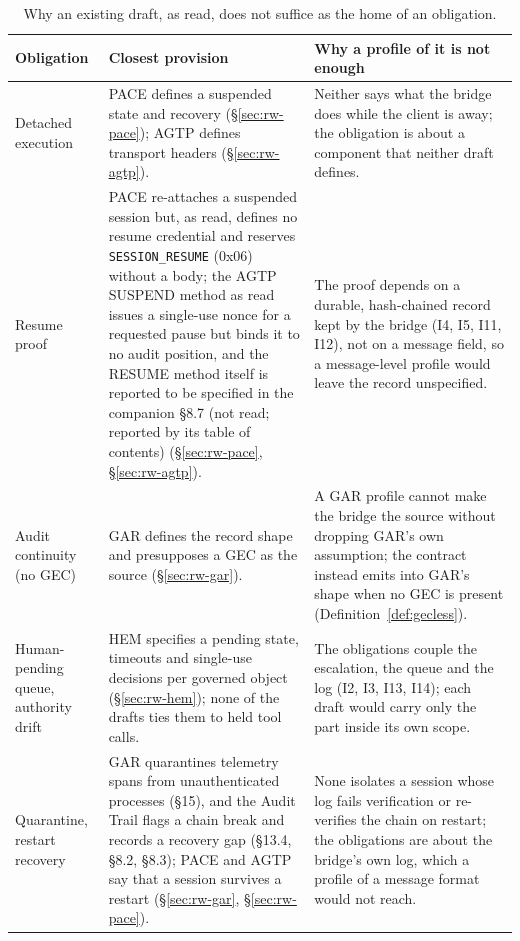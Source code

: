 \begin{table}[htbp]
\centering
\caption{Why an existing draft, as read, does not suffice as the home of
an obligation.}
\label{tab:why-separate}
\footnotesize
\begin{tabularx}{\columnwidth}{p{} X X}
\toprule
\textbf{Obligation} & \textbf{Closest provision} & \textbf{Why a profile of it is not enough} \\
\midrule
Detached execution & PACE defines a suspended state and recovery
(\S\ref{sec:rw-pace}); AGTP defines transport headers
(\S\ref{sec:rw-agtp}). & Neither says what the bridge does while the
client is away; the obligation is about a component that neither draft
defines. \\
Resume proof & PACE re-attaches a suspended session
but, as read, defines no resume credential and reserves
\texttt{SESSION\_RESUME} (0x06) without a body; the AGTP SUSPEND method as read issues
a single-use nonce for a requested pause but binds it to no audit
position, and the RESUME method itself is reported to be specified in the companion
\cite{I-D.hood-agtp-standard-methods} \S 8.7 (not read; reported by its table of contents) (\S\ref{sec:rw-pace}, \S\ref{sec:rw-agtp}). & The
proof depends on a durable, hash-chained record kept by the bridge
(I4, I5, I11, I12), not on a message field, so a message-level profile
would leave the record unspecified. \\
Audit continuity (no GEC) & GAR defines the record shape and presupposes a
GEC as the source (\S\ref{sec:rw-gar}). & A GAR profile cannot make the
bridge the source without dropping GAR's own assumption; the contract
instead emits into GAR's shape when no GEC is present
(Definition~\ref{def:gecless}). \\
Human-pending queue, authority drift &
HEM specifies a pending state, timeouts and single-use decisions per
governed object (\S\ref{sec:rw-hem}); none of the drafts ties them to held
tool calls. & The obligations couple the
escalation, the queue and the log (I2, I3, I13, I14); each draft would
carry only the part inside its own scope. \\
Quarantine, restart recovery & GAR quarantines telemetry spans from
unauthenticated processes (\S15), and the Audit Trail flags a chain break
and records a recovery gap (\S13.4, \S8.2, \S8.3); PACE and AGTP say that a
session survives a restart (\S\ref{sec:rw-gar}, \S\ref{sec:rw-pace}). &
None isolates a session whose log fails verification or re-verifies the
chain on restart; the obligations are about the bridge's own log, which a
profile of a message format would not reach. \\
\bottomrule
\end{tabularx}
\end{table}

